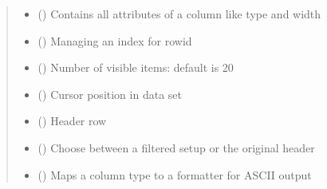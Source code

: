 \documentclass[letterpaper,10pt,english]{sphinxmanual}
\begin{document}
\begin{savenotes}
\begin{fulllineitems}
\begin{quote}
\begin{description}
\begin{itemize}
\item {} 
\sphinxAtStartPar
{} (\sphinxstyleliteralemphasis{\sphinxupquote{{[}}}{\hyperref[\detokenize{eezz:eezz.table.TTableColumn}]{\sphinxcrossref{\sphinxstyleliteralemphasis{\sphinxupquote{TTableColumn}}}}}\sphinxstyleliteralemphasis{\sphinxupquote{{]}}}) \textendash{} Contains all attributes of a column like type and width

\item {} 
\sphinxAtStartPar
{} (\sphinxstyleliteralemphasis{\sphinxupquote{{[}}}\sphinxstyleliteralemphasis{\sphinxupquote{{]}}}) \textendash{} Managing an index for row\sphinxhyphen{}id

\item {} 
\sphinxAtStartPar
{} () \textendash{} Number of visible items: default is 20

\item {} 
\sphinxAtStartPar
{} () \textendash{} Cursor position in data set

\item {} 
\sphinxAtStartPar
{} ({\hyperref[\detokenize{eezz:eezz.table.TTableRow}]{}}) \textendash{} Header row

\item {} 
\sphinxAtStartPar
{} () \textendash{} Choose between a filtered setup or the original header

\item {} 
\sphinxAtStartPar
{} (\sphinxstyleliteralemphasis{\sphinxupquote{{[}}}\sphinxstyleliteralemphasis{\sphinxupquote{, }}\sphinxstyleliteralemphasis{\sphinxupquote{{]}}}) \textendash{} Maps a column type to a formatter for ASCII output


\end{itemize}
\end{description}
\end{quote}
\end{fulllineitems}
\end{savenotes}
\end{document}
